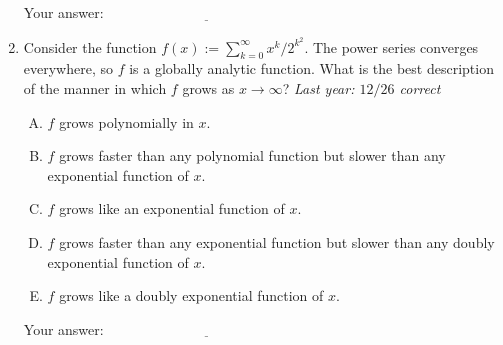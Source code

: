 \documentclass[10pt]{amsart}
\begin{document}
\begin{enumerate}
  \vspace{0.1in}
  Your answer: $\underline{\qquad\qquad\qquad\qquad\qquad\qquad\qquad}$
  \vspace{0.15in}

\item Consider the function $f(x) := \sum_{k=0}^\infty
  x^k/2^{k^2}$. The power series converges everywhere, so $f$ is a
  globally analytic function. What is the best description of the
  manner in which $f$ grows as $x \to \infty$? {\em Last year: $12/26$
  correct}

  \begin{enumerate}[(A)]
  \item $f$ grows polynomially in $x$.
  \item $f$ grows faster than any polynomial function but slower than
    any exponential function of $x$.
  \item $f$ grows like an exponential function of $x$.
  \item $f$ grows faster than any exponential function but slower than
    any doubly exponential function of $x$.
  \item $f$ grows like a doubly exponential function of $x$.
  \end{enumerate}

  \vspace{0.1in}
  Your answer: $\underline{\qquad\qquad\qquad\qquad\qquad\qquad\qquad}$
  \vspace{0.15in}


\end{enumerate}
\end{document}
